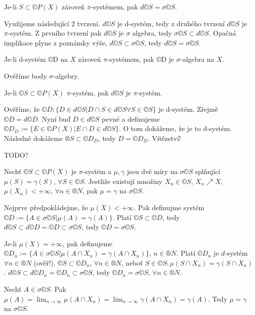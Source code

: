 \documentclass[12pt]{article}					%
\begin{document}
\begin{veta}[O rovnosti $d©S = \sigma©S$]
	Je-li $S \subset ©P(X)$ zároveň $\pi$-systémem, pak $d©S = \sigma©S$.

	\begin{dukazin}
		Využijeme následující 2 tvrzení. $d©S$ je d-systém, tedy z druhého tvrzení $d©S$ je $\pi$-systém. Z prvního tvrzení pak $d©S$ je $\sigma$ algebra, tedy $\sigma©S \subset d©S$. Opačná implikace plyne z poznámky výše, $d©S \subset \sigma©S$, tedy $d©S = \sigma ©S$.
	\end{dukazin}
\end{veta}

\begin{tvrzeni}
	Je-li d-systém ©D na $X$ zároveň $\pi$-systémem, pak ©D je $\sigma$-algebra na $X$.

	\begin{dukazin}
		Ověříme body $\sigma$-algebry.
	\end{dukazin}
\end{tvrzeni}

\begin{tvrzeni}
	Je-li $©S \subset ©P(X)$ $\pi$-systém, pak $d©S$ je $\pi$-systém.

	\begin{dukazin}
		Ověříme, že $©D: \{D \in d©S | D \cap S \in d©S \forall S \in ©S\}$ je d-systém. Zřejmě $©D = d©D$. Nyní buď $D \in d©S$ pevné a definujeme $©D_D := \{E \in ©P(X) | E \cap D \in d©S\}$. O tom dokážeme, že je to d-systém. Následně dokážeme $®S \subset ©D_D$, tedy $D = ©D_D$. Vítězství!
	\end{dukazin}
\end{tvrzeni}

TODO?


\begin{veta}
	Nechť $©S \subset ©P(X)$ je $\pi$-systém a $\mu, \gamma$ jsou dvě míry na $\sigma ©S$ splňující $\mu(S) = \gamma(S)$, $\forall S \in ©S$. Jestliže existují množiny $X_n \in ©S$, $X_n \nearrow X$, $\mu(X_n) < +∞$, $\forall n \in ®N$, pak $\mu = \gamma$ na $\sigma ©S$.

	\begin{dukazin}
		Nejprve předpokládejme, že $\mu(X) < +∞$. Pak definujme systém $©D := \{A \in \sigma ©S | \mu(A) = \gamma(A)\}$. Platí $©S \subset ©D$, tedy $d©S \subset d©D = ©D \subset \sigma ©S$, tedy $©D = \sigma©S$.

		Je-li $\mu(X) = +∞$, pak definujeme $©D_n := \{A \in \sigma ©S | \mu(A \cap X_n) = \gamma(A \cap X_n)\}$, $n \in ®N$. Platí $©D_n$ je $d$-systém $\forall n \in ®N$ (ověř!). $©S \subset ©D_n$, $\forall n \in ®N$, neboť $S \in ©S: \mu(S \cap X_n) = \gamma(S\cap X_n)$. $d©S \subset d©D_n = ©D_n \subset \sigma ©S$, tedy $©D_n = \sigma ©S$, $\forall n \in ®N$.

		Nechť $A \in \sigma ©S$. Pak $\mu(A) = \lim_{n \rightarrow ∞} \mu(A \cap X_n) = \lim_{n \rightarrow ∞} \gamma(A \cap X_n) = \gamma(A)$. Tedy $\mu = \gamma$ na $\sigma ©S$.
	\end{dukazin}
\end{veta}
\end{document}
